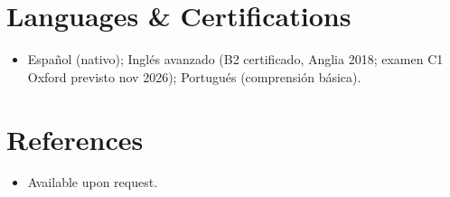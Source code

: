 \documentclass[11pt,a4paper,sans]{moderncv}
\begin{document}

\section{Languages \& Certifications}
\vspace{1pt}
\begin{itemize}
\item Español (nativo); Inglés avanzado (B2 certificado, Anglia 2018; examen C1 Oxford previsto nov 2026); Portugués (comprensión básica).
\end{itemize}


\section{References}
\vspace{1pt}
\begin{itemize}
\item{Available upon request.}
\end{itemize}
\end{document}
